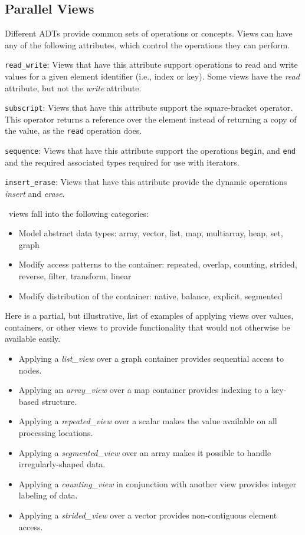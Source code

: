 \documentclass{report}
\begin{document}
\subsection{Parallel Views}

Different ADTs provide common sets of operations or concepts.
Views can have any of the following attributes, which control the
operations they can perform.

\texttt{read\_write}:
Views that have this attribute support operations to read and
write values for a given element identifier (i.e., index or key).
Some views have the \emph{read} attribute, but not the \emph{write}
attribute.

\texttt{subscript}:
Views that have this attribute support the square-bracket operator.
This operator returns a reference over the element instead of
returning a copy of the value, as the
\texttt{read}
operation does.

\texttt{sequence}:
Views that have this attribute support the operations
\texttt{begin},
and
\texttt{end}
and the required associated types
required for use with iterators.

\texttt{insert\_erase}:
Views that have this attribute provide the dynamic
operations \emph{insert} and \emph{erase}.

\stapl\ views fall into the following categories:

\begin{itemize}
\item
Model abstract data types:
\newline
array, vector, list, map, multiarray, heap, set, graph
\item
Modify access patterns to the container:
\newline
repeated, overlap, counting, strided, reverse, filter, transform, linear
\item
Modify distribution of the container:
\newline
native, balance, explicit, segmented
\end{itemize}

Here is a partial, but illustrative, list of examples of applying views
over values, containers, or other views to provide functionality that
would not otherwise be available easily.

\begin{itemize}
\item
Applying a \emph{list\_view} over a graph container
provides sequential access to nodes.
\item
Applying an \emph{array\_view} over a map container
provides indexing to a key-based structure.
\item
Applying a \emph{repeated\_view} over a scalar
makes the value available on all processing locations.
\item
Applying a \emph{segmented\_view} over an array
makes it possible to handle irregularly-shaped data.
\item
Applying a \emph{counting\_view} in conjunction with another view
provides integer labeling of data.
\item
Applying a \emph{strided\_view} over a vector
provides non-contiguous element access.
\end{itemize}
\end{document}
